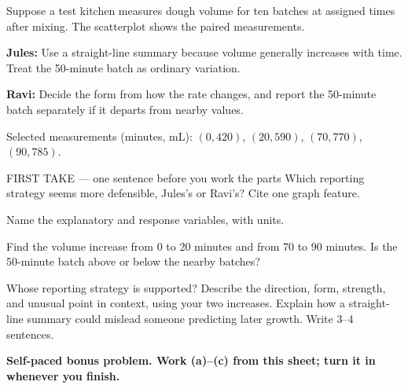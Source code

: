 \documentclass[14pt]{extarticle}
\begin{document}
\pagestyle{empty}


\noindent\begin{minipage}[t]{0.57\linewidth}
\vspace{0pt}
Suppose a test kitchen measures dough volume for ten batches at assigned times after mixing. The scatterplot shows the paired measurements.\par\smallskip \textbf{Jules:} Use a straight-line summary because volume generally increases with time. Treat the 50-minute batch as ordinary variation.\par \textbf{Ravi:} Decide the form from how the rate changes, and report the 50-minute batch separately if it departs from nearby values.\par Selected measurements (minutes, mL): $(0,420)$, $(20,590)$, $(70,770)$, $(90,785)$.\par
\end{minipage}\hfill
\begin{minipage}[t]{0.40\linewidth}
\vspace{0pt}
\begin{center}
\end{center}
\end{minipage}

\begin{firsttakebox}{FIRST TAKE --- one sentence before you work the parts}
Which reporting strategy seems more defensible, Jules's or Ravi's? Cite one graph feature.
\end{firsttakebox}

\begin{description}[leftmargin=1.15in, labelwidth=1in, itemsep=2pt, topsep=2pt]
  \item[\dokbadge{1}~(a)] Name the explanatory and response variables, with units.
  \item[\dokbadge{2}~(b)] Find the volume increase from 0 to 20 minutes and from 70 to 90 minutes. Is the 50-minute batch above or below the nearby batches?
  \item[\dokbadge{3}~(c)] Whose reporting strategy is supported? Describe the direction, form, strength, and unusual point in context, using your two increases. Explain how a straight-line summary could mislead someone predicting later growth. Write 3--4 sentences.
\end{description}

\vfill
\textbf{Self-paced bonus problem. Work (a)--(c) from this sheet; turn it in whenever you finish.}
\end{document}
